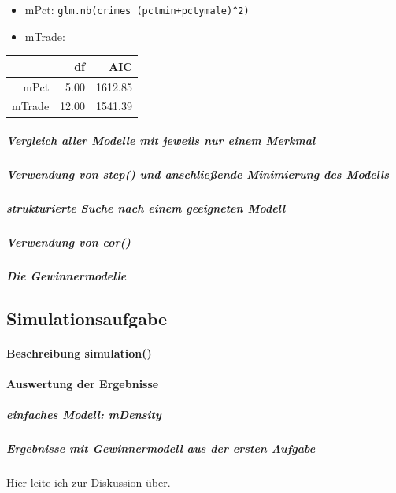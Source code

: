 \begin{itemize}
\item mPct: \texttt{glm.nb(crimes~(pctmin+pctymale)^2)}
\item mTrade: 
\label{lis:pct}
\end{itemize}

\begin{table}[ht]
\centering
\begin{tabular}{rrr}
  \hline
 & df & AIC \\ 
  \hline
mPct & 5.00 & 1612.85 \\ 
  mTrade & 12.00 & 1541.39 \\ 
   \hline
\end{tabular}
\label{tab:pct}
\end{table}



\subparagraph{Vergleich aller Modelle mit jeweils nur einem Merkmal}
\subparagraph{Verwendung von step() und anschließende Minimierung des Modells}
\subparagraph{strukturierte Suche nach einem geeigneten Modell}
\subparagraph{Verwendung von cor()}
\subparagraph{Die Gewinnermodelle}

\newpage 
\subsection{Simulationsaufgabe}
\paragraph{Beschreibung simulation()}
\paragraph{Auswertung der Ergebnisse}
\subparagraph{einfaches Modell: \textit{mDensity}}
\subparagraph{Ergebnisse mit Gewinnermodell aus der ersten Aufgabe}
Hier leite ich zur Diskussion \"uber.